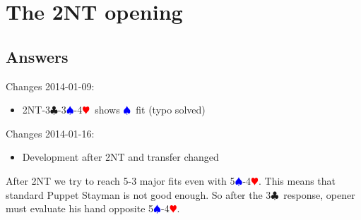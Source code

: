 \documentclass[a4paper]{article}
\newcommand{\BC}{\textcolor{OliveGreen}{$\clubsuit$}}
\newcommand{\BH}{\textcolor{Red}{$\varheartsuit${}}}
\newcommand{\BS}{\textcolor{Blue}{$\spadesuit${}}}
\begin{document}
\section{The 2NT opening}

\subsection{Answers}

Changes 2014-01-09:
\bigbreak
\begin{itemize}
\item 2NT-3\BC -3\BS -4\BH\ shows \BS\ fit (typo solved)

\end{itemize}
\bigbreak
Changes 2014-01-16:
\bigbreak
\begin{itemize}
\item Development after 2NT and transfer changed

\end{itemize}
\bigbreak
After 2NT we try to reach 5-3 major fits even with 5\BS -4\BH . This means that
standard Puppet Stayman is not good enough. So after the 3\BC\ response, opener
must evaluate his hand opposite 5\BS -4\BH .
\bigbreak
\
\end{document}
